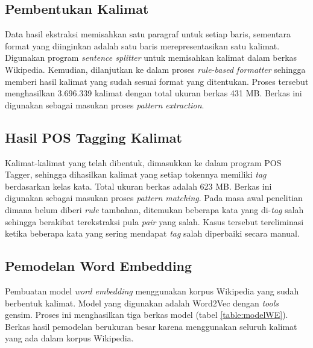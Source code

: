 \subsection{Pembentukan Kalimat}
Data hasil ekstraksi memisahkan satu paragraf untuk setiap baris, sementara format yang diinginkan adalah satu baris merepresentasikan satu kalimat. Digunakan program \textit{sentence splitter} untuk memisahkan kalimat dalam berkas Wikipedia. Kemudian, dilanjutkan ke dalam proses \textit{rule-based formatter} sehingga memberi hasil kalimat yang sudah sesuai format yang ditentukan. Proses tersebut menghasilkan 3.696.339 kalimat dengan total ukuran berkas 431 MB. Berkas ini digunakan sebagai masukan proses \textit{pattern extraction}. 

\subsection{Hasil POS Tagging Kalimat}
Kalimat-kalimat yang telah dibentuk, dimasukkan ke dalam program POS Tagger, sehingga dihasilkan kalimat yang setiap tokennya memiliki \textit{tag} berdasarkan kelas kata. Total ukuran berkas adalah 623 MB. Berkas ini digunakan sebagai masukan proses \textit{pattern matching}. Pada masa awal penelitian dimana belum diberi \textit{rule} tambahan, ditemukan beberapa kata yang di-\textit{tag} salah sehingga berakibat terekstraksi pula \textit{pair} yang salah. Kasus tersebut tereliminasi ketika beberapa kata yang sering mendapat \textit{tag} salah diperbaiki secara manual.

\subsection{Pemodelan Word Embedding}
Pembuatan model \textit{word embedding} menggunakan korpus Wikipedia yang sudah berbentuk kalimat. Model yang digunakan adalah Word2Vec dengan \textit{tools} gensim. Proses ini menghasilkan tiga berkas model (tabel \ref{table:modelWE}). Berkas hasil pemodelan berukuran besar karena menggunakan seluruh kalimat yang ada dalam korpus Wikipedia.


